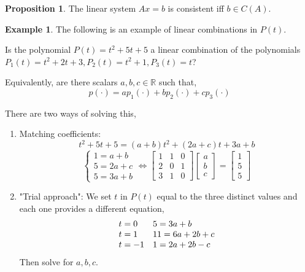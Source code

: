 \documentclass{report}
\theoremstyle{definition}
\newtheorem{ex}{Example}
\newtheorem{_prop}{Proposition}
\begin{document}
\begin{_prop}
The linear system $Ax=b$ is consistent iff $b\in C(A)$.
\end{_prop}

\begin{ex}
The following is an example of linear combinations in $P(t)$.

Is the polynomial $P(t)=t^2+5t+5$ a linear combination of the polynomials $P_1(t)=t^2+2t+3, P_2(t)=t^2+1, P_3(t)=t$?

Equivalently, are there scalars $a,b,c\in \mathbb{R}$ such that,
\[p(\cdot)=ap_1(\cdot)+bp_2(\cdot)+cp_3(\cdot)\]

There are two ways of solving this,
\begin{enumerate}
 \item Matching coefficients:
 \[t^2+5t+5=(a+b)t^2+(2a+c)t+3a+b\]
 \[\left\{ 
  \begin{array}{l}
    1 = a+b \\
    5=2a+c \\
    5=3a+b
  \end{array} \right. \Leftrightarrow
  \begin{bmatrix}
  1 & 1 & 0 \\
  2 & 0 & 1 \\
  3 & 1 & 0
  \end{bmatrix}
  \begin{bmatrix}
  a \\ b \\ c
  \end{bmatrix}=
  \begin{bmatrix}
  1 \\ 5 \\ 5
  \end{bmatrix}\]
 \item "Trial approach":
 We set $t$ in $P(t)$ equal to the three distinct values and each one provides a different equation,
 \[\begin{array}{l l}
 t=0 & 5=3a+b \\
 t=1 & 11=6a+2b+c \\
 t=-1 & 1=2a+2b-c
 \end{array}\]
 Then solve for $a, b, c$.
\end{enumerate}
\end{ex}
\end{document}
